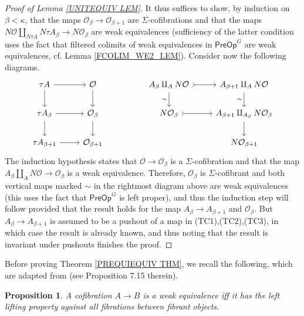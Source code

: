 \documentclass[a4paper,10pt
,draft
]{article}%
\numberwithin{equation}{section}
\numberwithin{figure}{section}
\newtheorem{proposition}[equation]{Proposition}%
\theoremstyle{definition} %
\newcommand{\1}{\ensuremath{\mathbbm 1}}%
\begin{document}
\begin{proof}[Proof of Lemma \ref{UNITEQUIV LEM}]
	It thus suffices to show, by induction on $\beta < \kappa$, 
	that the maps $\mathcal{O}_{\beta} \to \mathcal{O}_{\beta + 1}$ are $\Sigma$-cofibrations and that the maps 
	$N \mathcal{O} \amalg_{N \tau A} N \tau A_{\beta}
	\to 
	N \mathcal{O}_{\beta}$
	are weak equivalences
	(sufficiency of the latter condition uses the fact that 
	filtered colimits of weak equivalences in $\mathsf{PreOp}^G$ are weak equivalences, cf. Lemma \ref{FCOLIM_WE2_LEM}).
	Consider now the following diagrams.
	\[
	\begin{tikzcd}
	\tau A \ar{r} \ar{d} & \mathcal{O} \ar{d}
	&&
	A_{\beta} \amalg_{A} N \mathcal{O}
	\ar[>->]{r} \ar{d}[swap]{\sim} &
	A_{\beta+1} \amalg_{A} N \mathcal{O}
	\ar{d}[swap]{\sim}
	\\
	\tau A_{\beta} \ar{r} \ar{d} & \mathcal{O}_{\beta} \ar{d}
	&&
	N \mathcal{O}_{\beta} \ar[>->]{r} &
	A_{\beta+1} \amalg_{A_{\beta}} N \mathcal{O}_{\beta} \ar{d}
	\\
	\tau A_{\beta + 1} \ar{r} & \mathcal{O}_{\beta + 1}
	&&
	&
	N \mathcal{O}_{\beta+1}
	\end{tikzcd}
	\]
	The induction hypothesis states that
	$\mathcal{O} \to \mathcal{O}_{\beta}$ is a $\Sigma$-cofibration and that the map
	$A_{\beta} \amalg_A N \mathcal{O} \to \mathcal{O}_{\beta}$ is a weak equivalence.
	Therefore, $\mathcal{O}_{\beta}$ is $\Sigma$-cofibrant 
	and both vertical maps marked $\sim$ in the rightmost diagram above are weak equivalences 
	(this uses the fact that $\mathsf{PreOp}^G$ is left proper),
	and thus the induction step will follow provided that the result holds for
	the map $A_{\beta} \to A_{\beta + 1}$ and $\mathcal{O}_{\beta}$.
	But $A_{\beta} \to A_{\beta + 1}$ is assumed to be a pushout of a map in (TC1),(TC2),(TC3), 
	in which case the result is already known, and thus noting that the result is invariant under pushouts finishes the proof.
\end{proof}




Before proving Theorem \ref{PREQUIEQUIV THM}, 
we recall the following,
which are adapted from \cite{JT07} (see Proposition 7.15 therein). 


\begin{proposition}
	A cofibration $A \to B$ is a weak equivalence iff it has the left lifting property against all fibrations between fibrant objects.
\end{proposition}
\end{document}
